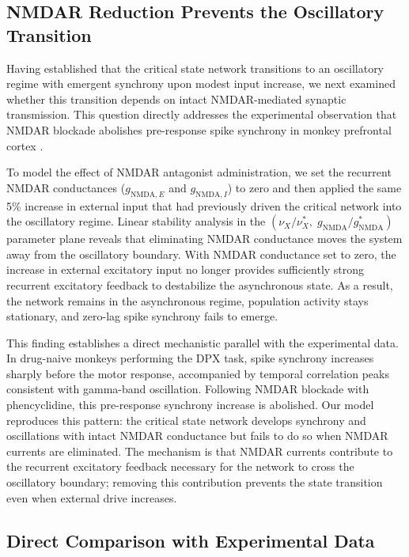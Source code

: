\documentclass[10pt]{article}
\begin{document}
\subsection{NMDAR Reduction Prevents the Oscillatory Transition}

Having established that the critical state network transitions to an oscillatory regime with emergent synchrony upon modest input increase, we next examined whether this transition depends on intact NMDAR-mediated synaptic transmission. This question directly addresses the experimental observation that NMDAR blockade abolishes pre-response spike synchrony in monkey prefrontal cortex \citep{zick2018blocking}.

To model the effect of NMDAR antagonist administration, we set the recurrent NMDAR conductances ($g_{\mathrm{NMDA},E}$ and $g_{\mathrm{NMDA},I}$) to zero and then applied the same 5\% increase in external input that had previously driven the critical network into the oscillatory regime. Linear stability analysis in the $(\nu_X / \nu_X^*, \; g_{\mathrm{NMDA}} / g_{\mathrm{NMDA}}^*)$ parameter plane reveals that eliminating NMDAR conductance moves the system away from the oscillatory boundary. With NMDAR conductance set to zero, the increase in external excitatory input no longer provides sufficiently strong recurrent excitatory feedback to destabilize the asynchronous state. As a result, the network remains in the asynchronous regime, population activity stays stationary, and zero-lag spike synchrony fails to emerge.

This finding establishes a direct mechanistic parallel with the experimental data. In drug-naive monkeys performing the DPX task, spike synchrony increases sharply before the motor response, accompanied by temporal correlation peaks consistent with gamma-band oscillation. Following NMDAR blockade with phencyclidine, this pre-response synchrony increase is abolished. Our model reproduces this pattern: the critical state network develops synchrony and oscillations with intact NMDAR conductance but fails to do so when NMDAR currents are eliminated. The mechanism is that NMDAR currents contribute to the recurrent excitatory feedback necessary for the network to cross the oscillatory boundary; removing this contribution prevents the state transition even when external drive increases.

\subsection{Direct Comparison with Experimental Data}
\end{document}
